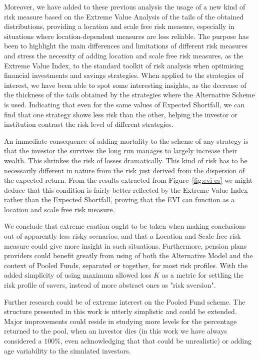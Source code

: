 Moreover, we have added to these previous analysis the usage of a new kind of risk measure based on the Extreme Value Analysis of the tails of the obtained distributions, providing a location and scale free risk measure, especially in situations where location-dependent measures are less reliable. The purpose has been to highlight the main differences and limitations of different risk measures and stress the necessity of adding location and scale free risk measures, as the Extreme Value Index, to the standard toolkit of risk analysis when optimising financial investments and savings strategies. When applied to the strategies of interest, we have been able to spot some interesting insights, as the decrease of the thickness of the tails obtained by the strategies where the Alternative Scheme is used. Indicating that even for the same values of Expected Shortfall, we can find that one strategy shows less risk than the other, helping the investor or institution contrast the risk level of different strategies.

An immediate consequence of adding mortality to the scheme of any strategy is that the investor the survives the long run manages to largely increase their wealth. This shrinkes the risk of losses dramatically. This kind of risk has to be necessarily different in nature from the risk just derived from the dispersion of the expected return. From the results extracted from Figure~\ref{fig:evi-es} we might deduce that this condition is fairly better reflected by the Extreme Value Index rather than the Expected Shortfall, proving that the EVI can function as a location and scale free risk measure.

We conclude that extreme caution ought to be taken when making conclusions out of apparently less risky scenarios; and that a Location and Scale free risk measure could give more insight in such situations. Furthermore, pension plans providers could benefit greatly from using of both the Alternative Model and the context of Pooled Funds, separated or together, for most risk profiles. With the added simplicity of using maximum allowed loss $K$ as a metric for settling the risk profile of savers, instead of more abstract ones as "risk aversion".

Further research could be of extreme interest on the Pooled Fund scheme. The structure presented in this work is utterly simplistic and could be extended. Major improvements could reside in studying more levels for the percentage returned to the pool, when an investor dies (in this work we have always considered a $100\%$, even acknowledging that that could be unrealistic) or adding age variability to the simulated investors.
